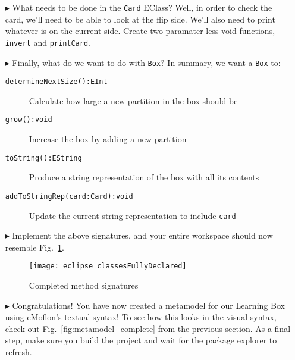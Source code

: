 \begin{itemize}
\vspace{0.5cm}

\item[$\blacktriangleright$] What needs to be done in the \texttt{Card} EClass? Well, in order to check the card, we'll need to be able to look at the flip
side. We'll also need to print whatever is on the current side. Create two paramater-less void functions, \texttt{invert} and \texttt{printCard}. 

\item[$\blacktriangleright$] Finally, what do we want to do with \texttt{Box}? In summary, we want a \texttt{Box} to:

\begin{description}
  \item[\texttt{determineNextSize():EInt}] Calculate how large a new partition in the box should be
  \item[\texttt{grow():void}] Increase the box by adding a new partition
  \item[\texttt{toString():EString}] Produce a string representation of the box with all its contents
  \item[\texttt{addToStringRep(card:Card):void}] Update the current string representation to include \texttt{card}
\end{description}

\item[$\blacktriangleright$] Implement the above signatures, and your entire workspace should now resemble Fig.~\ref{fig:workspaceMethods}.

\begin{figure}[htbp]
	\centering
  \texttt{[image: eclipse\_classesFullyDeclared]}
	\caption{Completed method signatures}
	\label{fig:workspaceMethods}
\end{figure}

\item[$\blacktriangleright$] Congratulations! You have now created a metamodel for our Learning Box using eMoflon's textual syntax! To see how
this looks in the visual syntax, check out Fig.~\ref{fig:metamodel_complete} from the previous section. As a final step, make sure you build the project and
wait for the package explorer to refresh. 



\end{itemize}
